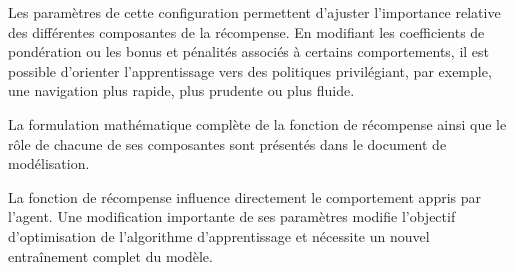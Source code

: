 \noindent Les paramètres de cette configuration permettent d'ajuster l'importance relative des différentes composantes de la récompense. En modifiant les coefficients de pondération ou les bonus et pénalités associés à certains comportements, il est possible d'orienter l'apprentissage vers des politiques privilégiant, par exemple, une navigation plus rapide, plus prudente ou plus fluide.

\vspace{10pt}

\noindent La formulation mathématique complète de la fonction de récompense ainsi que le rôle de chacune de ses composantes sont présentés dans le document de modélisation.

\begin{tcolorbox}[colback=YellowGreen!5,colframe=YellowGreen,title=Remarque]
    La fonction de récompense influence directement le comportement appris par l'agent. Une modification importante de ses paramètres modifie l'objectif d'optimisation de l'algorithme d'apprentissage et nécessite un nouvel entraînement complet du modèle.
\end{tcolorbox}

